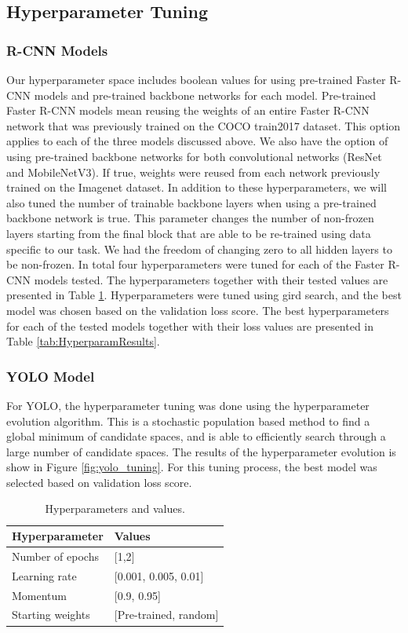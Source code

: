 \documentclass[conference]{IEEEtran}
\begin{document}
\subsection{Hyperparameter Tuning}
\subsubsection{R-CNN Models}
Our hyperparameter space includes boolean values for using pre-trained Faster R-CNN models and pre-trained backbone networks for each model. Pre-trained Faster R-CNN models mean reusing the weights of an entire Faster R-CNN network that was previously trained on the COCO train2017 dataset. This option applies to each of the three models discussed above. We also have the option of using pre-trained backbone networks for both convolutional networks (ResNet and MobileNetV3).  If true, weights were reused from each network previously trained on the Imagenet dataset. In addition to these hyperparameters, we will also tuned the number of trainable backbone layers when using a pre-trained backbone network is true. This parameter changes the number of non-frozen layers starting from the final block that are able to be re-trained using data specific to our task. We had the freedom of changing zero to all hidden layers to be non-frozen. In total four hyperparameters were tuned for each of the Faster R-CNN models tested. The hyperparameters together with their tested values are presented in Table \ref{tab:HyperparamVals}. Hyperparameters were tuned using gird search, and the best model was chosen based on the validation loss score. The best hyperparameters for each of the tested models together with their loss values are presented in Table \ref{tab:HyperparamResults}. 
\subsubsection{YOLO Model}
For YOLO, the hyperparameter tuning was done using the hyperparameter evolution algorithm. This is a stochastic population based method to find a global minimum of candidate spaces, and is able to efficiently search through a large number of candidate spaces. The results of the hyperparameter evolution is show in Figure \ref{fig:yolo_tuning}. For this tuning process, the best model was selected based on validation loss score. 

\begin{table}[]
\centering
\caption{\label{tab:HyperparamVals}Hyperparameters and values.}
\begin{tabular}{|l|l|}
\hline
Hyperparameter   & Values                    \\ \hline
Number of epochs & {[}1,2{]}                 \\ \hline
Learning rate    & {[}0.001, 0.005, 0.01{]}  \\ \hline
Momentum         & {[}0.9, 0.95{]}           \\ \hline
Starting weights & {[}Pre-trained, random{]} \\ \hline
\end{tabular}
\end{table}
\end{document}
